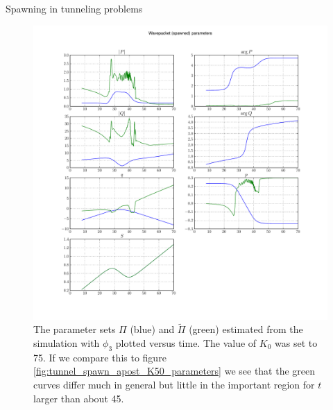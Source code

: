 \begin{chapter}{Spawning in tunneling problems}
\begin{figure}[h!]
  \centering
  \includegraphics[width=\the\linewidth]{./figures/eckart_spawn_apost_phi3_K75/wavepacket_parameters_abs_ang_spawned.pdf}
  \caption[The parameter sets $\Pi$ and $\tilde{\Pi}$]{The parameter sets $\Pi$
  (blue) and $\tilde{\Pi}$ (green) estimated from the simulation with $\phi_3$
  plotted versus time. The value of $K_0$ was set to 75.
  If we compare this to figure \ref{fig:tunnel_spawn_apost_K50_parameters} we see
  that the green curves differ much in general but little in the important region
  for $t$ larger than about 45.}
\end{figure}



\end{chapter}

